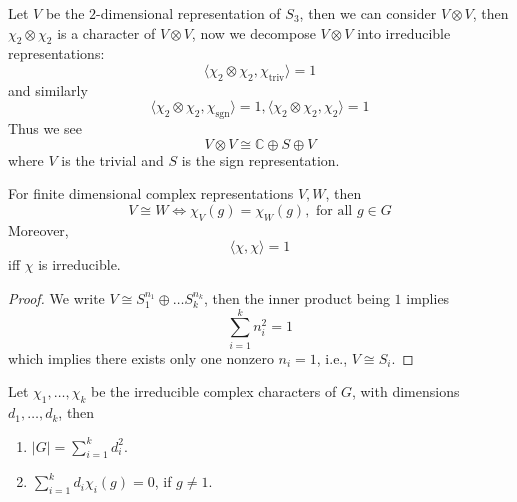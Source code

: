 \documentclass[openany]{book}
\newcommand{\C}{\mathbb{C}}
\newcommand{\la}{\langle}
\newcommand{\ra}{\rangle}
\begin{document}
\begin{example}
    Let $V$ be the $2$-dimensional representation of $S_3$, then we can consider $V\otimes V$, then $\chi_2\otimes\chi_2$ is a character of $V\otimes V$, now we decompose $V\otimes V$ into irreducible representations:
    \begin{equation*}
        \la \chi_2\otimes\chi_2, \chi_{\text{triv}}\ra=1
    \end{equation*}
    and similarly 
    \begin{equation*}
        \la \chi_2\otimes\chi_2, \chi_{\text{sgn}}\ra=1,  \la \chi_2\otimes\chi_2, \chi_2\ra=1
    \end{equation*}
    Thus we see 
    \begin{equation*}
        V\otimes V\cong \C\oplus S\oplus V
    \end{equation*}
    where $V$ is the trivial and $S$ is the sign representation.
\end{example}

\begin{prop}
    For finite dimensional complex representations $V,W$, then 
    \begin{equation*}
        V\cong W\iff \chi_V(g)=\chi_W(g), \text{ for all } g\in G
    \end{equation*}
    Moreover, 
    \begin{equation*}
        \la \chi,\chi\ra=1
    \end{equation*}
    iff $\chi$ is irreducible.
\end{prop}
\begin{proof}
    We write $V\cong S_1^{n_1}\oplus\dots S_k^{n_k}$, then the inner product being $1$ implies 
    \begin{equation*}
        \sum_{i=1}^kn_i^2=1
    \end{equation*}
    which implies there exists only one nonzero $n_i=1$, i.e., $V\cong S_i$.
\end{proof}

\begin{prop}[orthogonality]
    Let $\chi_1,\dots,\chi_k$ be the irreducible complex characters of $G$, with dimensions $d_1,\dots, d_k$, then 
    \begin{enumerate}
        \item $|G|=\sum_{i=1}^kd_i^2$.
        \item $\sum_{i=1}^kd_i\chi_i(g)=0$, if $g\neq 1$.
    \end{enumerate} 
\end{prop}
\end{document}
